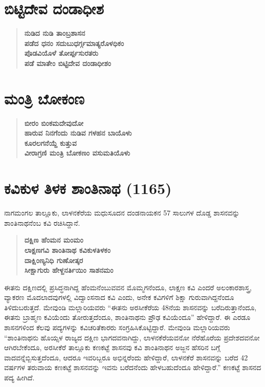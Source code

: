 \section*{ಬಿಟ್ಟಿದೇವ ದಂಡಾಧೀಶ}

\begin{verse}
\textbf{ನುಡಿದ ನುಡಿ ತಾಂಬ್ರಶಾಸನ} \\\textbf{ಪಡೆದ ಧನಂ ಸದುಬುಧರ್ಗ್ಗಮಾತ್ಯರೊಳಧಿಕಂ} \\\textbf{ಪೊಡವಿಯೊಳೆ ತೋರ್ಪ್ಪಸುರತರು} \\\textbf{ಪಡೆ ಮಾತೇಂ ಬಿಟ್ಟಿದೇವ ದಂಡಾಧೀಶಂ}
\end{verse}


\section*{ಮಂತ್ರಿ ಬೋಕಂಣ}

\begin{verse}
\textbf{ಬೀರಂ ಬಿಂಕಮದೇವುದೋ} \\\textbf{ಹಾರುವ ನಿನಗೆಂದು ನುಡಿವ ಗಳಹನ ಬಾಯೊಳು} \\\textbf{ಕೂರಲಗನೆಯ್ದೆ ಕುತ್ತುವ} \\\textbf{ವೀರಾಗ್ರಣಿ ಮಂತ್ರಿ ಬೋಕಣಂ ವಸುಮತಿಯೊಳು}
\end{verse}


\section*{ಕವಿಕುಳ ತಿಳಕ ಶಾಂತಿನಾಥ (1165)}

ನಾಗಮಂಗಲ ತಾಲ್ಲೂಕು, ಲಾಳನಕೆರೆಯ ಮಧುಸೂದನ ದಂಡನಾಯಕನ 57 ಸಾಲುಗಳ ದೊಡ್ಡ ಶಾಸನವನ್ನು ಶಾಂತಿನಾಥನೆಂಬ ಕವಿ ರಚಿಸಿದ್ದಾನೆ.

\begin{verse}
\textbf{ದಕ್ಷಿಣ ಹೆಂಮನ ಮಂಮಂ } \\\textbf{ಲಾಕ್ಷಣಗವಿ ಶಾಂತಿನಾಥ ಕವಿಕುಳತಿಳಕಂ} \\\textbf{ದಾಕ್ಷಿಂಣ್ಯನಿಧಿ ಗುಣೋತ್ಕರ } \\\textbf{ಸೀಕ್ಷಾಗುರು ಹೇಳ್ದನರ್ತಿಯಿಂ ಸಾಶನಮಂ}
\end{verse}

ಈತನು ದಕ್ಷಿಣದಲ್ಲಿ ಪ್ರಸಿದ್ಧನಾಗಿದ್ದ ಹೆಂಮನೆಂಬುವವನ ಮೊಮ್ಮಗನೆಂದೂ, ಲಾಕ್ಷಣ ಕವಿ ಎಂದರೆ ಅಲಂಕಾರಶಾಸ್ತ್ರ, ವ್ಯಾಕರಣ ಮೊದಲಾದವುಗಳಲ್ಲಿ ವಿದ್ವಾಂಸನಾದ ಕವಿ ಎಂದು, ಅನೇಕ ಕವಿಗಳಿಗೆ ಶಿಕ್ಷಾ ಗುರುವಾಗಿದ್ದನೆಂದೂ ತಿಳಿದುಬರುತ್ತದೆ. ಮೇವುಂಡಿ ಮಲ್ಲಾರಿಯವರು “ಈತನು ಅರಸೀಕೆರೆಯ 48ನೆಯ ಶಾಸನವನ್ನು ಬರೆದಿರುತ್ತಾನೆಂದೂ, ಈತನು ಬ್ರಾಹ್ಮಣ ಕವಿಯೆಂದು ತೋರುತ್ತ\-ದೆಂದೂ, ಶಾಂತಿನಾಥನು ಪ್ರೌಢ ಕವಿಯೆಂದೂ” ಹೇಳಿದ್ದಾರೆ. ಈ ಎರಡೂ ಶಾಸನಗಳಿಂದ ಕೆಲವು ಪದ್ಯಗಳನ್ನು ಕವಿಚರಿತೆಕಾರರು ಸಂಗ್ರಹಿಸಿಕೊಟ್ಟಿದ್ದಾರೆ. ಮೇವುಂಡಿ ಮಲ್ಲಾರಿಯವರು “ಶಾಂತಿನಾಥನು ಹೊಯ್ಸಳ ರಾಜ್ಯದ ದಕ್ಷಿಣ ಭಾಗದವನಾಗಿದ್ದು, ಲಾಳನಕೆರೆಯವನೋ ನೆರೆಹೊರೆಯ ಪ್ರದೇಶದವನೋ ಆಗಿರಬೇಕೆಂದೂ, ಅರಸೀಕೆರೆ ತಾಲ್ಲೂಕು ಕಣಕಟ್ಟೆ ಶಾಸನವು ಕವಿ ಶಾಂತಿನಾಥನ ಅಜ್ಜನ ಹೆಸರಿನ ಬಗ್ಗೆ ವಾದವನ್ನೆಬ್ಬಿಸುತ್ತದೆಂದೂ, ಆದರೂ ಇವರಿಬ್ಬರೂ ಅಭಿನ್ನರೆಂದು ಹೇಳಿದ್ದಾರೆ, ಲಾಳನಕೆರೆ ಶಾಸನವನ್ನು ಬರೆದ 42 ವರ್ಷಗಳ ತರುವಾಯ ಕಣಕಟ್ಟೆ ಶಾಸನವನ್ನು ಇವನು ಬರೆದನೆಂದು ಹೇಳಬಹುದೆಂದೂ ಹೇಳಿದ್ದಾರೆ.” ಕಣಕಟ್ಟೆ ಶಾಸನದ ಪದ್ಯ ಹೀಗಿದೆ.

